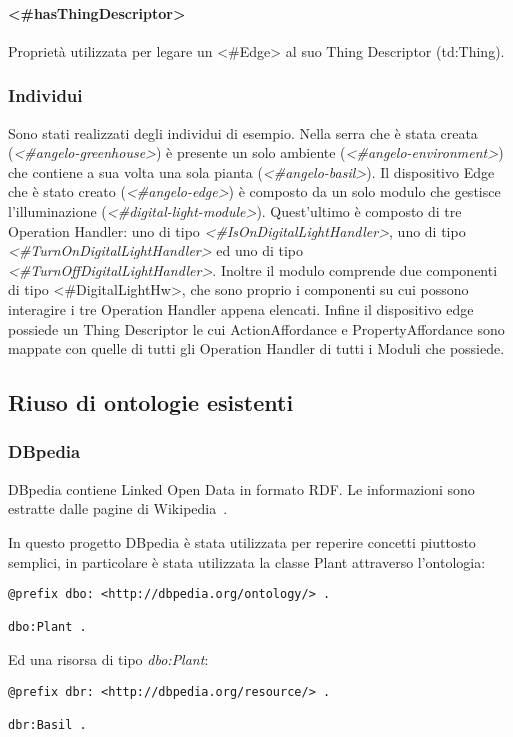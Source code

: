 \paragraph{<\#hasThingDescriptor>}
Proprietà utilizzata per legare un <\#Edge> al suo Thing Descriptor (td:Thing).

\subsubsection{Individui}
Sono stati realizzati degli individui di esempio. Nella serra che è stata creata (\textit{<\#angelo-greenhouse>}) è presente un solo ambiente (\textit{<\#angelo-environment>}) che contiene a sua volta una sola pianta (\textit{<\#angelo-basil>}). Il dispositivo Edge che è stato creato (\textit{<\#angelo-edge>}) è composto da un solo modulo che gestisce l'illuminazione (\textit{<\#digital-light-module>}). Quest'ultimo è composto di tre Operation Handler: uno di tipo \textit{<\#IsOnDigitalLightHandler>}, uno di tipo \textit{<\#TurnOnDigitalLightHandler>} ed uno di tipo \textit{<\#TurnOffDigitalLightHandler>}.
Inoltre il modulo comprende due componenti di tipo <\#DigitalLightHw>, che sono proprio i componenti su cui possono interagire i tre Operation Handler appena elencati. Infine il dispositivo edge possiede un Thing Descriptor le cui ActionAffordance e PropertyAffordance sono mappate con quelle di tutti gli Operation Handler di tutti i Moduli che possiede.

\subsection{Riuso di ontologie esistenti}
\subsubsection{DBpedia}
DBpedia contiene Linked Open Data in formato RDF. Le informazioni sono estratte dalle pagine di Wikipedia~\cite{wwwdbped0:online}.

\noindent In questo progetto DBpedia è stata utilizzata per reperire concetti piuttosto semplici, in particolare è stata utilizzata la classe Plant attraverso l'ontologia:
\begin{verbatim}
@prefix dbo: <http://dbpedia.org/ontology/> .

dbo:Plant .
\end{verbatim}
Ed una risorsa di tipo \textit{dbo:Plant}:
\begin{verbatim}
@prefix dbr: <http://dbpedia.org/resource/> .

dbr:Basil .
\end{verbatim}

